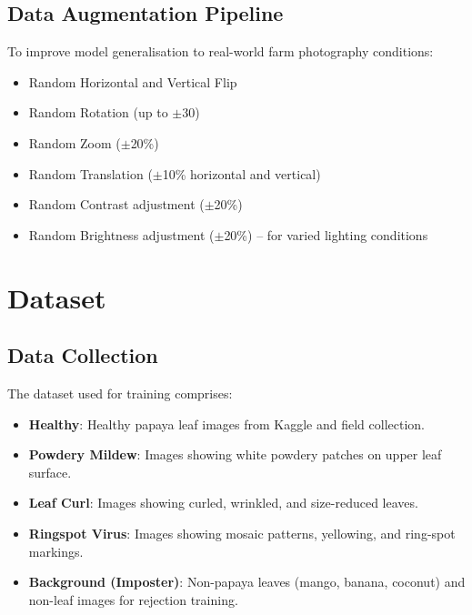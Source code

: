 \documentclass[12pt,a4paper]{report}
\begin{document}
\subsection{Data Augmentation Pipeline}
To improve model generalisation to real-world farm photography conditions:
\begin{itemize}
    \item Random Horizontal and Vertical Flip
    \item Random Rotation (up to $\pm$30\textdegree)
    \item Random Zoom ($\pm$20\%)
    \item Random Translation ($\pm$10\% horizontal and vertical)
    \item Random Contrast adjustment ($\pm$20\%)
    \item Random Brightness adjustment ($\pm$20\%) -- for varied lighting conditions
\end{itemize}

\section{Dataset}
\subsection{Data Collection}
The dataset used for training comprises:
\begin{itemize}
    \item \textbf{Healthy}: Healthy papaya leaf images from Kaggle and field collection.
    \item \textbf{Powdery Mildew}: Images showing white powdery patches on upper leaf surface.
    \item \textbf{Leaf Curl}: Images showing curled, wrinkled, and size-reduced leaves.
    \item \textbf{Ringspot Virus}: Images showing mosaic patterns, yellowing, and ring-spot markings.
    \item \textbf{Background (Imposter)}: Non-papaya leaves (mango, banana, coconut) and non-leaf images for rejection training.
\end{itemize}
\end{document}
